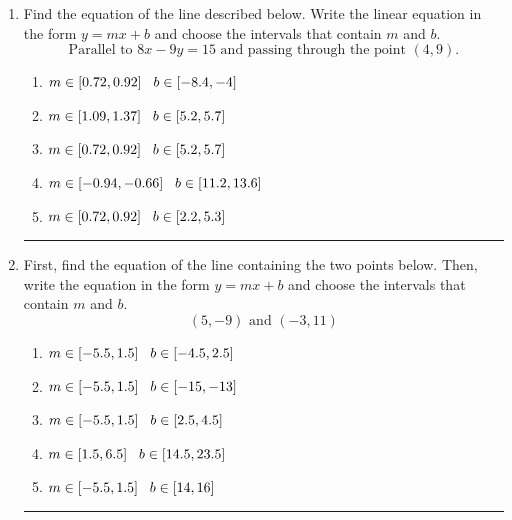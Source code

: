 \documentclass[14pt]{extbook}
\newcommand{\litem}[1]{\item#1\hspace*{-1cm}\rule{\textwidth}{0.4pt}}
\begin{document}
\begin{enumerate}
{\begin{enumerate}[label=\Alph*.]
\end{enumerate} }
\litem{
Find the equation of the line described below. Write the linear equation in the form $ y=mx+b $ and choose the intervals that contain $m$ and $b$.\[ \text{Parallel to } 8 x - 9 y = 15 \text{ and passing through the point } (4, 9). \]\begin{enumerate}[label=\Alph*.]
\item \( m \in [0.72, 0.92] \hspace*{3mm} b \in [-8.4, -4] \)
\item \( m \in [1.09, 1.37] \hspace*{3mm} b \in [5.2, 5.7] \)
\item \( m \in [0.72, 0.92] \hspace*{3mm} b \in [5.2, 5.7] \)
\item \( m \in [-0.94, -0.66] \hspace*{3mm} b \in [11.2, 13.6] \)
\item \( m \in [0.72, 0.92] \hspace*{3mm} b \in [2.2, 5.3] \)

\end{enumerate} }
\litem{
First, find the equation of the line containing the two points below. Then, write the equation in the form $ y=mx+b $ and choose the intervals that contain $m$ and $b$.\[ (5, -9) \text{ and } (-3, 11) \]\begin{enumerate}[label=\Alph*.]
\item \( m \in [-5.5, 1.5] \hspace*{3mm} b \in [-4.5, 2.5] \)
\item \( m \in [-5.5, 1.5] \hspace*{3mm} b \in [-15, -13] \)
\item \( m \in [-5.5, 1.5] \hspace*{3mm} b \in [2.5, 4.5] \)
\item \( m \in [1.5, 6.5] \hspace*{3mm} b \in [14.5, 23.5] \)
\item \( m \in [-5.5, 1.5] \hspace*{3mm} b \in [14, 16] \)


\end{enumerate}}
\end{enumerate}
\end{document}
